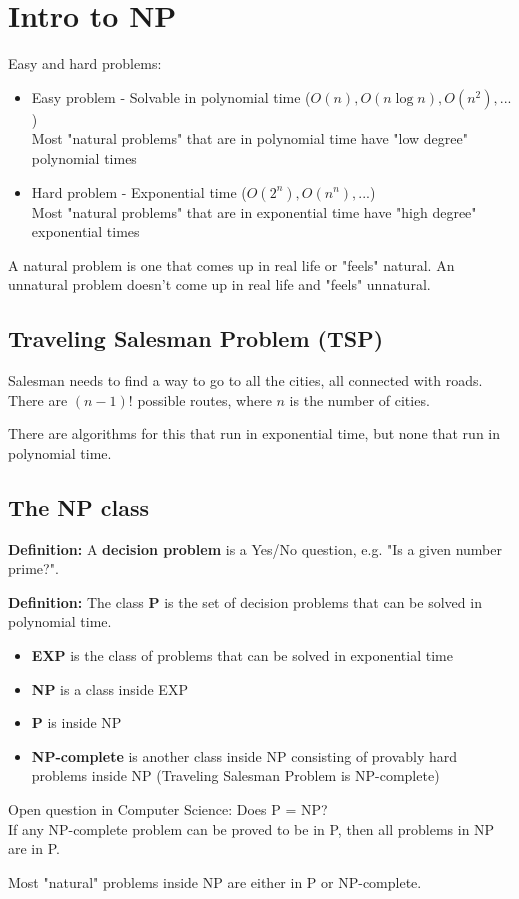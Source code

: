 \section{Intro to NP}

Easy and hard problems:
\begin{itemize}
    \item Easy problem - Solvable in polynomial time ($O(n), O(n\log n), O(n^2), ...$)\\
    Most "natural problems" that are in polynomial time have "low degree" polynomial times
    \item Hard problem - Exponential time ($O(2^n), O(n^n), ...$)\\
    Most "natural problems" that are in exponential time have "high degree" exponential times
\end{itemize}

A natural problem is one that comes up in real life or "feels" natural. An unnatural problem doesn't come up in real life and "feels" unnatural.

\subsection*{Traveling Salesman Problem (TSP)}

Salesman needs to find a way to go to all the cities, all connected with roads. There are $(n-1)!$ possible routes, where $n$ is the number of cities.

There are algorithms for this that run in exponential time, but none that run in polynomial time.

\subsection*{The NP class}

\textbf{Definition:} A \textbf{decision problem} is a Yes/No question, e.g. "Is a given number prime?".

\textbf{Definition:} The class \textbf{P} is the set of decision problems that can be solved in polynomial time.

\begin{itemize}
    \item \textbf{EXP} is the class of problems that can be solved in exponential time
    \item \textbf{NP} is a class inside EXP
    \item \textbf{P} is inside NP
    \item \textbf{NP-complete} is another class inside NP consisting of provably hard problems inside NP (Traveling Salesman Problem is NP-complete)
\end{itemize}

Open question in Computer Science: Does P = NP?\\
If any NP-complete problem can be proved to be in P, then all problems in NP are in P.

Most "natural" problems inside NP are either in P or NP-complete.
